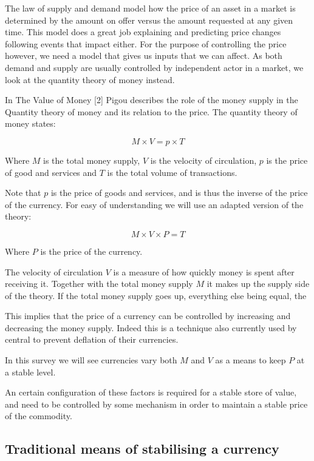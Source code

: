 \documentclass[english,]{IEEEtran}
\begin{document}
The law of supply and demand model how the price of an asset in a market
is determined by the amount on offer versus the amount requested at any
given time. This model does a great job explaining and predicting price
changes following events that impact either. For the purpose of
controlling the price however, we need a model that gives us inputs that
we can affect. As both demand and supply are usually controlled by
independent actor in a market, we look at the quantity theory of money
instead.

In The Value of Money {[}2{]} Pigou describes the role of the money
supply in the Quantity theory of money and its relation to the price.
The quantity theory of money states:

\[ M \times V = p \times T \]

Where \(M\) is the total money supply, \(V\) is the velocity of
circulation, \(p\) is the price of good and services and \(T\) is the
total volume of transactions.

Note that \(p\) is the price of goods and services, and is thus the
inverse of the price of the currency. For easy of understanding we will
use an adapted version of the theory:

\[ M \times V \times P = T \]

Where \(P\) is the price of the currency.

The velocity of circulation \(V\) is a measure of how quickly money is
spent after receiving it. Together with the total money supply \(M\) it
makes up the supply side of the theory. If the total money supply goes
up, everything else being equal, the

This implies that the price of a currency can be controlled by
increasing and decreasing the money supply. Indeed this is a technique
also currently used by central to prevent deflation of their currencies.

In this survey we will see currencies vary both \(M\) and \(V\) as a
means to keep \(P\) at a stable level.

An certain configuration of these factors is required for a stable store
of value, and need to be controlled by some mechanism in order to
maintain a stable price of the commodity.

\subsection{Traditional means of stabilising a
currency}\label{traditional-means-of-stabilising-a-currency}
\end{document}
